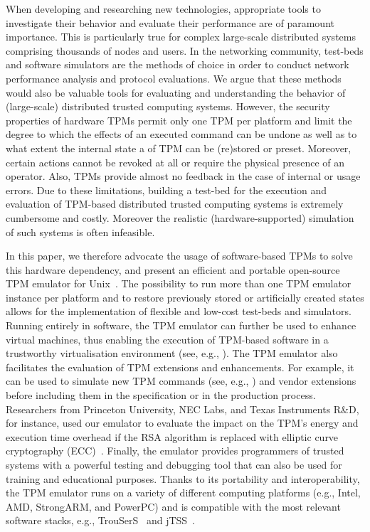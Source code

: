\documentclass[runningheads]{llncs}
\begin{document}
When developing and researching new technologies, appropriate tools to
investigate their behavior and evaluate their performance are of paramount
importance. This is particularly true for complex large-scale distributed
systems comprising thousands of nodes and users.
In the networking community, test-beds and software simulators are the methods
of choice in order to conduct network performance analysis and protocol
evaluations. We argue that these methods would also be valuable tools for
evaluating and understanding the behavior of (large-scale) distributed trusted
computing systems. However, the security properties of hardware TPMs permit
only one TPM per platform and limit the degree to which the effects of an
executed command can be undone as well as to what extent the internal state
a of TPM can be (re)stored or preset. Moreover, certain actions cannot be
revoked at all or require the physical presence of an operator. Also, TPMs
provide almost no feedback in the case of internal or usage errors. Due to
these limitations, building a test-bed for the execution and evaluation of
TPM-based distributed trusted computing systems is extremely cumbersome and
costly. Moreover the realistic (hardware-supported) simulation of such
systems is often infeasible.

In this paper, we therefore advocate the usage of software-based TPMs to
solve this hardware dependency, and present an efficient and portable
open-source TPM emulator for Unix~\cite{TPMEmu}. The possibility to run
more than one TPM emulator instance per platform and to restore previously
stored or artificially created states allows for the implementation of
flexible and low-cost test-beds and simulators. Running entirely in software,
the TPM emulator can further be used to enhance virtual machines, thus
enabling the execution of TPM-based software in a trustworthy virtualisation
environment (see, e.g., \cite{Xen}).
The TPM emulator also facilitates the evaluation of TPM extensions and
enhancements. For example, it can be used to simulate new TPM commands
(see, e.g., \cite{Sarmenta}) and vendor extensions before including them
in the specification or in the production process.
Researchers from Princeton University, NEC Labs, and Texas Instruments R\&D,
for instance, used our emulator to evaluate the impact on the TPM's energy
and execution time overhead if the RSA algorithm is replaced with elliptic
curve cryptography (ECC)~\cite{Aaraj}. Finally, the emulator provides
programmers of trusted systems with a powerful testing and debugging tool
that can also be used for training and educational purposes. Thanks to its
portability and interoperability, the TPM emulator runs on a variety of
different computing platforms (e.g., Intel, AMD, StrongARM, and PowerPC)
and is compatible with the most relevant software stacks,
e.g., TrouSerS~\cite{trousers} and jTSS~\cite{jTSS}.
\end{document}
